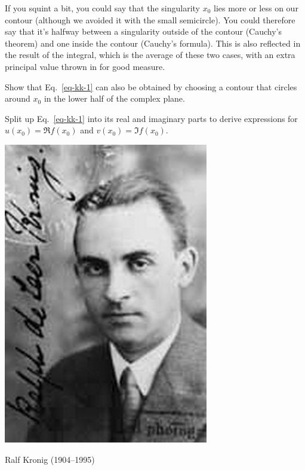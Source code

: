 If you squint a bit, you could say that the singularity $x_0$ lies more or less on our contour (although we avoided it with the small semicircle). You could therefore say that it's halfway between a singularity outside of the contour (Cauchy's theorem) and one inside the contour (Cauchy's formula). This is also reflected in the result of the integral, which is the average of these two cases, with an extra principal value thrown in for good measure.

\begin{exer}
Show that Eq.~\ref{eq-kk-1} can also be obtained by choosing a contour that circles around $x_0$ in the lower half of the complex plane.
\end{exer}

\begin{cue}
Split up Eq.~\ref{eq-kk-1} into its real and imaginary parts to derive expressions for $ u(x_0)= \Re f(x_0)$ and $ v(x_0)= \Im f(x_0)$.
\end{cue}

\begin{marginfigure}[-1.5cm]
  \includegraphics{complex/figures/r_kronig}
  \caption{Ralf Kronig (1904–1995)}
\end{marginfigure}

